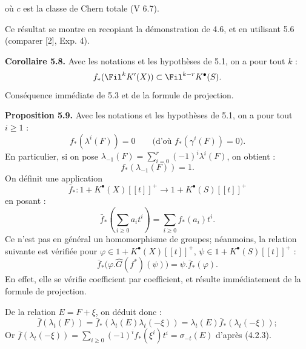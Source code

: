 où $c$ est la
classe de Chern totale (V 6.7).

Ce résultat se montre en recopiant la démonstration de 4.6, et en utilisant 5.6 (comparer [2], Exp. 4).

\textbf{Corollaire 5.8.} Avec les notations et les hypothèses de 5.1, on a pour tout $k$ :
\[
  f_*(\Fil^kK'(X))\subset \Fil^{k-r}K^{\bullet}(S).
\]
Conséquence immédiate de 5.3 et de la formule de projection.

\textbf{Proposition 5.9.} Avec les notations et les hypothèses de 5.1, on a pour tout $i\ge 1$ :
\[
  f_*(\lambda^i(F))=0\qquad\bigl(\text{d'où }f_*(\gamma^i(F))=0\bigr).
\]
En particulier, si on pose $\lambda_{-1}(F)=\sum_{i=0}^{r}(-1)^i\lambda^i(F)$, on obtient :
\[
  f_*(\lambda_{-1}(F))=1.
\]
On définit une application
\[
  \bar f_*:1+K^{\bullet}(X)[[t]]^+\longrightarrow 1+K^{\bullet}(S)[[t]]^+
\]
en posant :
\[
  \bar f_*\left(\sum_{i\ge0}a_it^i\right)=\sum_{i\ge0}f_*(a_i)t^i .
\]
Ce n'est pas en général un homomorphisme de groupes; néanmoins, la relation suivante est vérifiée pour $\varphi\in 1+K^{\bullet}(X)[[t]]^+$, $\psi\in 1+K^{\bullet}(S)[[t]]^+$ :
\[
  \bar f_*\bigl(\varphi.\hat G(f^*)(\psi)\bigr)=\psi.\bar f_*(\varphi).
\]
En effet, elle se vérifie coefficient par coefficient, et résulte immédiatement de la formule de projection.

De la relation $E=F+\xi$, on déduit donc :
\[
  \bar f(\lambda_t(F))=
  \bar f_*(\lambda_t(E)\lambda_t(-\xi))=
  \lambda_t(E)\bar f_*(\lambda_t(-\xi));
\]
Or $\bar f(\lambda_t(-\xi))=\sum_{i\ge0}(-1)^if_*(\xi^i)t^i=\sigma_{-t}(E)$ d'après (4.2.3).
